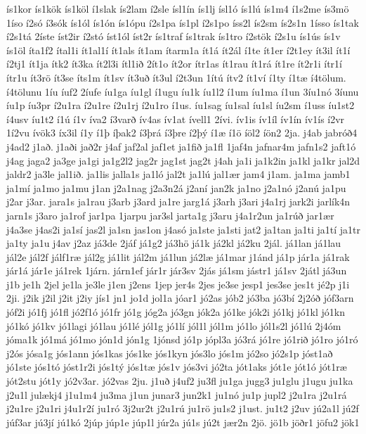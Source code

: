 {ís1kor
ís1kök
ís1köl
í1slak
ís2lam
í2sle
ísl1ín
ís1lj
ísl1ó
ís1lú
ís1m4
í1s2me
ís3mö
1íso
í2só
í3sók
ís1ól
ís1ón
ís1ópu
í2s1pa
ís1pl
í2s1po
íss2l
ís2sm
ís2s1n
1ísso
ís1tak
í2s1tá
2íste
íst2ir
í2stó
íst1ól
íst2r
ís1traf
ís1trak
ís1tro
í2stök
í2s1u
ís1ús
ís1v
ís1öl
íta1f2
ítal1i
ít1al1í
ít1als
ít1am
ítarm1a
ít1á
ít2ál
í1te
ít1er
í2t1ey
ít3il
ít1í
í2tj1
ít1ja
ítk2
ít3ka
ít2l3i
ítl1ið
2ít1o
ít2or
ítr1as
ít1rau
ít1rá
ít1re
ít2r1i
ítr1í
ítr1u
ít3rö
ít3se
íts1m
ít1sv
ít3uð
ít3ul
í2t3un
1ítú
ítv2
ít1ví
í1ty
í1tæ
í4tölum.
í4tölunu
1íu
íuf2
2íufe
íu1ga
íu1gl
í1ugu
íu1k
íu1l2
í1um
íu1ma
í1un
3íu1nó
3íunu
íu1p
íu3pr
í2u1ra
í2u1re
í2u1rj
í2u1ro
í1us.
íu1sag
íu1sal
íu1sl
íu2sm
í1uss
íu1st2
í4usv
íu1t2
í1ú
í1v
íva2
í3varð
ív4as
ív1at
ívell1
2ívi.
ív1is
ív1íl
ív1ín
ív1ís
í2vr
1í2vu
ívök3
íx3il
í1y
í1þ
íþak2
í3þrá
í3þre
í2þý
í1æ
í1ö
íöl2
íön2
2ja.
j4ab
jabróð4
j4ad2
j1að.
j1aði
jað2r
j4af
jaf2al
jaf1et
ja1fið
ja1fl
1jaf4n
jafnar4m
jafn1s2
jaft1ó
j4ag
jaga2
ja3ge
ja1gi
ja1g2l2
jag2r
jag1st
jag2t
j4ah
ja1i
ja1k2in
ja1kl
ja1kr
jal2d
jaldr2
ja3le
jal1ið.
ja1lis
jalla1s
ja1ló
jal2t
ja1lú
jal1ær
jam4
j1am.
ja1ma
jamb1
ja1mí
ja1mo
ja1mu
j1an
j2a1nag
j2a3n2á
j2aní
jan2k
ja1no
j2a1nó
j2anú
ja1pu
j2ar
j3ar.
jara1s
ja1rau
j3arb
j3ard
ja1re
jarg1á
j3arh
j3ari
j4a1rj
jark2i
jarlík4n
jarn1s
j3aro
ja1rof
jar1pa
1jarpu
jar3sl
jarta1g
j3aru
j4a1r2un
ja1rúð
jar1ær
j4a3se
j4as2i
ja1sí
jas2l
ja1sn
jas1on
j4asó
ja1ste
ja1sti
jat2
ja1tan
ja1ti
ja1tí
ja1tr
ja1ty
ja1u
j4av
j2az
já3de
2jáf
já1g2
já3hö
já1k
já2kl
já2ku
2jál.
já1lan
já1lau
jál2e
jál2f
jálf1ræ
jál2g
já1lit
jál2m
já1lun
já2læ
já1mar
j1ánd
já1p
jár1a
já1rak
jár1á
jár1e
já1rek
1járn.
járn1ef
jár1r
jár3sv
2jás
já1sm
jástr1
já1sv
2játl
já3un
j1b
je1h
2jel
je1la
je3le
j1en
j2ens
1jep
jer4s
2jes
je3se
jesp1
jes3se
jes1t
jé2p
j1i
2ji.
j2ik
j2il
j2it
j2iy
jís1
jn1
jo1d
jol1a
jóar1
jó2as
jób2
jó3ba
jó3bí
2j2óð
jóf3arn
jóf2i
jó1fj
jó1fl
jó2f1ó
jó1fr
jó1g
jóg2a
jó3gn
jók2a
jó1ke
jók2i
jó1kj
jó1kl
jó1kn
jó1kó
jó1kv
jó1lagi
jó1lau
jó1lé
jól1g
jó1lí
jól1l
jól1m
jó1lo
jól1s2l
jó1lú
2j4óm
jóma1k
jó1má
jó1mo
jón1d
jón1g
1jónsd
jó1p
jópl3a
jó3rá
jó1re
jó1rið
jó1ro
jó1ró
j2ós
jósa1g
jós1ann
jós1kas
jós1ke
jós1kyn
jós3lo
jós1m
jó2so
jó2s1p
jóst1að
jó1ste
jós1tó
jóst1r2i
jós1tý
jós1tæ
jós1v
jós3vi
jó2ta
jót1aks
jót1e
jót1ó
jót1ræ
jót2stu
jót1y
jó2v3ar.
jó2vas
2ju.
j1uð
j4uf2
ju3fl
ju1ga
jugg3
ju1glu
j1ugu
ju1ka
j2u1l
julækj4
j1u1m4
ju3ma
j1un
junar3
jun2k1
ju1nó
ju1p
jupl2
j2u1ra
j2u1rá
j2u1re
j2u1ri
j4u1r2í
ju1ró
3j2ur2t
j2u1rú
ju1rö
ju1s2
j1ust.
ju1t2
j2uv
jú2a1l
jú2f
júf3ar
jú3jí
jú1kó
2júp
júp1e
júp1l
júr2a
jú1s
jú2t
jær2n
2jö.
jö1b
jöðr1
jöfu2
jök1
}
